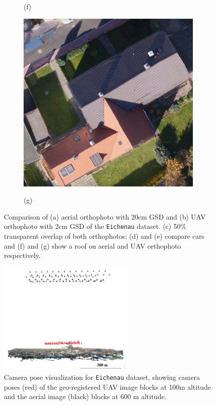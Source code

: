 \begin{figure}[tbp]
\begin{subfigure}[tbp]{0.236\columnwidth}
           {{\small }}    
           \centerline{\small{(f)}}\medskip
       \end{subfigure}
       \hfill
       \begin{subfigure}[tbp]{0.236\columnwidth}
           \centering
           \includegraphics[width=\textwidth]{figures_5/eichenau_roof_uav.png}
           {{\small }}    
           \centerline{\small{(g)}}\medskip
       \end{subfigure}          
       \caption{Comparison of (a) aerial orthophoto with 20cm GSD and (b) UAV orthophoto with 2cm GSD of the \texttt{Eichenau} dataset. (c) 50\% transparent overlap of both orthophotos; (d) and (e) compare cars and (f) and (g) show a roof on aerial and UAV orthophoto respectively.}
       \label{fig:ortho_eichenau}
\end{figure}


\begin{figure}[tbp]
	\centering
	\includegraphics[width=0.6\textwidth]{figures_5/cams_side.png}
	{{\small }} 
    \caption{Camera pose visualization for \texttt{Eichenau} dataset, showing camera poses (red) of the geo-registered UAV image blocks at 100m altitude and  the aerial image (black) blocks at 600 m altitude.}
    \label{fig:campos}
\end{figure}


